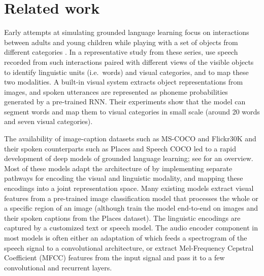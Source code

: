 \section{Related work}
\label{sec:related}

Early attempts at simulating grounded language learning focus on interactions between adults and young children while playing with a set of objects from different categories \cite{roy1999learning, roy2000grounded, roy2000learning, roy2002learning, gorniak2003visually, mukherjee2003visual}. In a representative study from these series, \citet{roy2002learning} use speech recorded from such interactions paired with different views of the visible objects to identify linguistic units (i.e.\ words) and visual categories, and to map these two modalities. A built-in visual system extracts object representations from images, and spoken utterances are represented as phoneme probabilities generated by a pre-trained RNN. Their experiments show that the model can segment words and map them to visual categories in small scale (around 20 words and seven visual categories).

The availability of image-caption datasets such as MS-COCO \cite{lin2014microsoft} and Flickr30K \cite{plummer2015flickr30k} and their spoken counterparts such as Places \cite{zhou2014learning} and Speech COCO \cite{speech_coco} led to a rapid development of deep models of grounded language learning; see \citet{chrupala-visually-2021} for an overview. Most of these models adapt the architecture of \citet{karpathy2014deep} by implementing separate pathways for encoding the visual and linguistic modality, and mapping these encodings into a joint representation space. Many existing models extract visual features from a pre-trained image classification model that processes the whole or a specific region of an image (although \cite{harwath2018jointly} train the model end-to-end on images and their spoken captions from the Places dataset). The linguistic encodings are captured by a customized text or speech model.  The audio encoder component in most models is often either an adaptation of \citet{harwath2016unsupervised} which feeds a spectrogram of the speech signal to a convolutional architecture, or extract  Mel-Frequency Cepstral Coefficient (MFCC) features from the input signal and pass it to a few convolutional and recurrent layers. 

